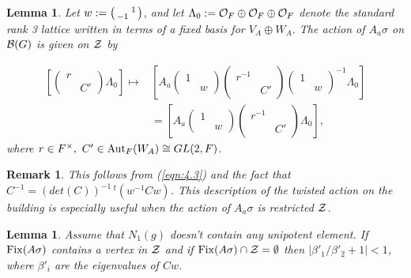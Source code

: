 \documentclass[12pt,letterpaper]{article}
\newtheorem{lemma}[theorem]{Lemma}
\newtheorem{remark}{Remark}
\def\zz{{\cal Z}}
\def\off{{\cal O}_F}
\def\bbg{{\cal B}(G)}
\begin{document}
\begin{lemma}
\label{lemma:5.3}
Let $w:=\left(\smallmatrix \ &1\\-1&\ \endsmallmatrix
\right)$, and let $\Lambda_0:=\off\oplus\off\oplus\off$ denote the standard
rank 3 lattice written in terms of a fixed basis for $V_A\oplus W_A$.
The action of $A_a\sigma$ on $\bbg$ is given on $\zz$ by

\[
\begin{split}
\left[ 
\left(
\begin{array}{cc} 
r&\ \\\ &C'
\end{array}\right)
\Lambda_0\right] \longmapsto
&\left[ A_a
\left(
\begin{array}{cc} 
1&\ \\ \ &w
\end{array}\right)
\left(
\begin{array}{cc} 
r^{-1}&\ \\
\ &C'
\end{array}\right)
\left(
\begin{array}{cc} 
1&\ \\\ &w
\end{array}\right)^{-1}\Lambda_0\right]\\
&=\left[ A_a
\left(
\begin{array}{cc} 
1&\ \\\ &w
\end{array}\right)
\left(
\begin{array}{cc} 
r^{-1}&\ \\\ &C'
\end{array}\right)
\Lambda_0\right],
\end{split}
\]
where $r\in F^{\times},\ C'\in {\rm Aut}_F(W_A)\cong GL(2,F)$.
\end{lemma}

\begin{remark} This follows from (\ref{eqn:4.3}) and the fact that
$C^{-1}=(det(C))^{-1}\, ^t(w^{-1}Cw)$. This description of the twisted
action on the building is especially useful when the action of
$A_a\sigma$ is restricted $\zz$.
\end{remark}

\begin{lemma}
\label{lemma:5.4} 
Assume that $N_1(g)$ doesn't contain any
unipotent element. If ${\rm Fix}(A\sigma )$
contains a
vertex  in $\zz$ and if
${\rm Fix}(A\sigma )\cap\zz = \emptyset$ then $|\beta'_1/\beta'_2 +1|<1$,
where $\beta'_i$ are the eigenvalues of $Cw$.
\end{lemma}
\end{document}
